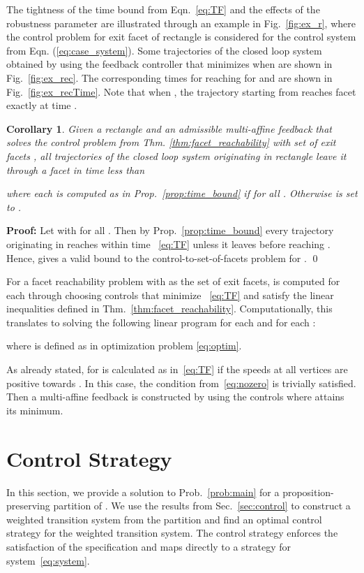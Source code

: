 \documentclass{ifacconf}
\newtheorem{corollary}{Corollary}
\begin{document}
The tightness of the time bound from Eqn.~\eqref{eq:TF} and the effects of the robustness parameter  are illustrated through an example in Fig.~\ref{fig:ex_r}, where the control problem for exit facet  of rectangle  is considered for the control system from Eqn. (\ref{eq:case_system}). Some trajectories of the closed loop system obtained by using the feedback controller that minimizes  when  are shown in Fig.~\ref{fig:ex_rec}. 
The corresponding times for reaching  for  and  are shown in Fig.~\ref{fig:ex_recTime}. 
Note that when , the trajectory starting from  reaches facet  exactly at time .


\begin{corollary}\label{prop:multi_facet_time_bound}
Given a rectangle  and  an admissible multi-affine feedback  that solves the control problem from Thm. \ref{thm:facet_reachability} with set of exit facets , all trajectories of the closed loop system originating in rectangle  leave it through a facet  in time less than 

 where each  is computed as in Prop.~\ref{prop:time_bound} if  for all . Otherwise  is set to .
\end{corollary}


{\bf Proof:} Let  with  for all . Then by Prop.~\ref{prop:time_bound} every trajectory originating in  reaches  within time ~\eqref{eq:TF} unless it leaves  before reaching . Hence,  gives a valid bound to the control-to-set-of-facets problem for .
\qed

For a facet reachability problem with  as the set of exit facets,   is computed for each  through choosing controls that minimize ~\eqref{eq:TF} and satisfy the linear inequalities defined in Thm.~\ref{thm:facet_reachability}. Computationally, this translates to solving the following linear program for each  and for each : 

where  is defined as in optimization problem \eqref{eq:optim}.

As already stated,  for  is calculated as in~\eqref{eq:TF} if the speeds at all vertices are positive towards . In this case, the condition from~\eqref{eq:nozero} is trivially satisfied. Then a multi-affine feedback  is constructed by using the controls where  attains its minimum. 

\section{Control Strategy}\label{sec:controlStrategy}

In this section, we provide a solution to Prob.~\ref{prob:main} for a proposition-preserving partition of . We use the results from Sec.~\ref{sec:control} to construct a weighted transition system from the partition and find an optimal control strategy for the weighted transition system. The control strategy enforces the satisfaction of the specification and maps directly to a strategy for system~\eqref{eq:system}.
\end{document}
